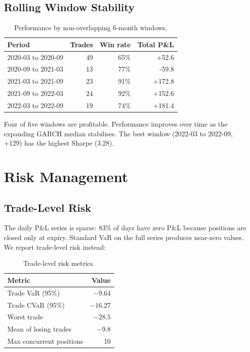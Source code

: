 \documentclass[11pt,a4paper]{article}
\begin{document}
\subsection{Rolling Window Stability}

\begin{table}[H]
\centering
\caption{Performance by non-overlapping 6-month windows.}
\begin{tabular}{lrrr}
\toprule
Period & Trades & Win rate & Total P\&L \\
\midrule
2020-03 to 2020-09 & 49 & 65\% & +52.6 \\
2020-09 to 2021-03 & 13 & 77\% & -59.8 \\
2021-03 to 2021-09 & 23 & 91\% & +172.8 \\
2021-09 to 2022-03 & 24 & 92\% & +152.6 \\
2022-03 to 2022-09 & 19 & 74\% & +181.4 \\
\bottomrule
\end{tabular}
\end{table}

Four of five windows are profitable. Performance improves over time as the expanding GARCH median stabilises. The best window (2022-03 to 2022-09, +129) has the highest Sharpe (3.28).


\section{Risk Management}

\subsection{Trade-Level Risk}

The daily P\&L series is sparse: 83\% of days have zero P\&L because positions are closed only at expiry. Standard VaR on the full series produces near-zero values. We report trade-level risk instead:

\begin{table}[H]
\centering
\caption{Trade-level risk metrics.}
\begin{tabular}{lr}
\toprule
Metric & Value \\
\midrule
Trade VaR (95\%) & $-9.64$ \\
Trade CVaR (95\%) & $-16.27$ \\
Worst trade & $-28.5$ \\
Mean of losing trades & $-9.8$ \\
Max concurrent positions & 10 \\
\bottomrule
\end{tabular}
\end{table}
\end{document}
